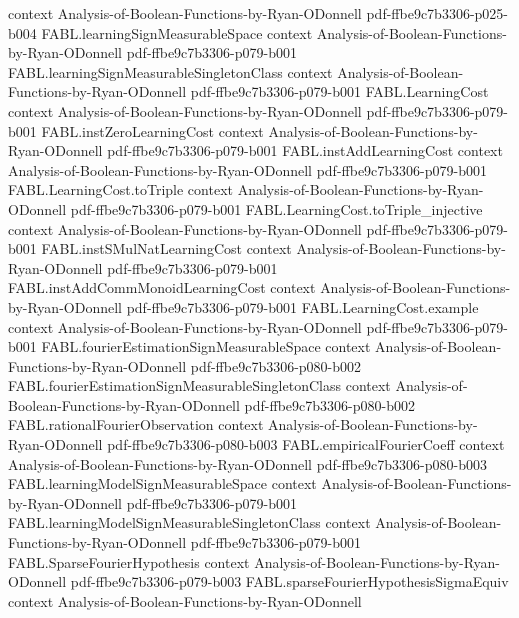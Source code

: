 \begin{theorem}
  {context}
  {Analysis-of-Boolean-Functions-by-Ryan-ODonnell}
  {pdf-ffbe9c7b3306-p025-b004}
\proofstep
  {FABL.learningSignMeasurableSpace}
  {context}
  {Analysis-of-Boolean-Functions-by-Ryan-ODonnell}
  {pdf-ffbe9c7b3306-p079-b001}
\proofstep
  {FABL.learningSignMeasurableSingletonClass}
  {context}
  {Analysis-of-Boolean-Functions-by-Ryan-ODonnell}
  {pdf-ffbe9c7b3306-p079-b001}
\proofstep
  {FABL.LearningCost}
  {context}
  {Analysis-of-Boolean-Functions-by-Ryan-ODonnell}
  {pdf-ffbe9c7b3306-p079-b001}
\proofstep
  {FABL.instZeroLearningCost}
  {context}
  {Analysis-of-Boolean-Functions-by-Ryan-ODonnell}
  {pdf-ffbe9c7b3306-p079-b001}
\proofstep
  {FABL.instAddLearningCost}
  {context}
  {Analysis-of-Boolean-Functions-by-Ryan-ODonnell}
  {pdf-ffbe9c7b3306-p079-b001}
\proofstep
  {FABL.LearningCost.toTriple}
  {context}
  {Analysis-of-Boolean-Functions-by-Ryan-ODonnell}
  {pdf-ffbe9c7b3306-p079-b001}
\proofstep
  {FABL.LearningCost.toTriple_injective}
  {context}
  {Analysis-of-Boolean-Functions-by-Ryan-ODonnell}
  {pdf-ffbe9c7b3306-p079-b001}
\proofstep
  {FABL.instSMulNatLearningCost}
  {context}
  {Analysis-of-Boolean-Functions-by-Ryan-ODonnell}
  {pdf-ffbe9c7b3306-p079-b001}
\proofstep
  {FABL.instAddCommMonoidLearningCost}
  {context}
  {Analysis-of-Boolean-Functions-by-Ryan-ODonnell}
  {pdf-ffbe9c7b3306-p079-b001}
\proofstep
  {FABL.LearningCost.example}
  {context}
  {Analysis-of-Boolean-Functions-by-Ryan-ODonnell}
  {pdf-ffbe9c7b3306-p079-b001}
\proofstep
  {FABL.fourierEstimationSignMeasurableSpace}
  {context}
  {Analysis-of-Boolean-Functions-by-Ryan-ODonnell}
  {pdf-ffbe9c7b3306-p080-b002}
\proofstep
  {FABL.fourierEstimationSignMeasurableSingletonClass}
  {context}
  {Analysis-of-Boolean-Functions-by-Ryan-ODonnell}
  {pdf-ffbe9c7b3306-p080-b002}
\proofstep
  {FABL.rationalFourierObservation}
  {context}
  {Analysis-of-Boolean-Functions-by-Ryan-ODonnell}
  {pdf-ffbe9c7b3306-p080-b003}
\proofstep
  {FABL.empiricalFourierCoeff}
  {context}
  {Analysis-of-Boolean-Functions-by-Ryan-ODonnell}
  {pdf-ffbe9c7b3306-p080-b003}
\proofstep
  {FABL.learningModelSignMeasurableSpace}
  {context}
  {Analysis-of-Boolean-Functions-by-Ryan-ODonnell}
  {pdf-ffbe9c7b3306-p079-b001}
\proofstep
  {FABL.learningModelSignMeasurableSingletonClass}
  {context}
  {Analysis-of-Boolean-Functions-by-Ryan-ODonnell}
  {pdf-ffbe9c7b3306-p079-b001}
\proofstep
  {FABL.SparseFourierHypothesis}
  {context}
  {Analysis-of-Boolean-Functions-by-Ryan-ODonnell}
  {pdf-ffbe9c7b3306-p079-b003}
\proofstep
  {FABL.sparseFourierHypothesisSigmaEquiv}
  {context}
  {Analysis-of-Boolean-Functions-by-Ryan-ODonnell}

\end{theorem}
